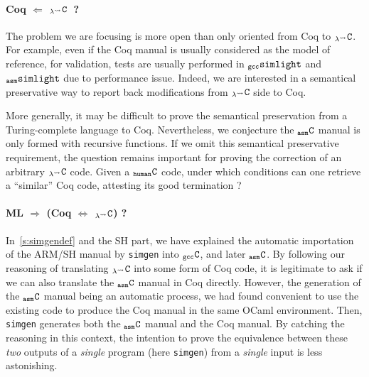 \documentclass[a4paper, 11pt]{article}
\newcommand{\gccSL}{$_{\tt gcc}{\tt simlight}$\xspace}
\newcommand{\aSL}{$_{\tt asm}{\tt simlight}$\xspace} %
\newcommand{\simgen}{{\tt simgen}\xspace}
\newcommand{\gccC}{$_{\tt gcc}{\tt C}$\xspace}
\newcommand{\hC}{$_{\tt human}{\tt C}$\xspace}
\newcommand{\aC}{$_{\tt asm}{\tt C}$\xspace}
\newcommand{\lC}{$_{\lambda^\leadsto}{\tt C}$\xspace}
\begin{document}
\paragraph{Coq $\Longleftarrow$ \lC~?}
The problem we are focusing is more open than only oriented from Coq to \lC. For example, even if the Coq manual is usually considered as the model of reference, for validation, tests are usually performed in \gccSL and \aSL due to performance issue. Indeed, we are interested in a semantical preservative way to report back modifications from \lC side to Coq. 

More generally, it may be difficult to prove the semantical preservation from a Turing-complete language to Coq. Nevertheless, we conjecture the \aC manual is only formed with recursive functions. If we omit this semantical preservative requirement, the question remains important for proving the correction of an arbitrary \lC code. Given a \hC code, under which conditions can one retrieve a ``similar'' Coq code, attesting its good termination ? 

\paragraph{ML $\Longrightarrow$ (Coq $\Longleftrightarrow$ \lC) ?}

In~\ref{s:simgendef} and the SH part, we have explained the automatic importation of the ARM/SH manual by \simgen into \gccC, and later \aC. By following our reasoning of translating \lC into some form of Coq code, it is legitimate to ask if we can also translate the \aC manual in Coq directly. However, the generation of the \aC manual being an automatic process, we had found convenient to use the existing code to produce the Coq manual in the same OCaml environment. Then, \simgen generates both the \aC manual and the Coq manual. By catching the reasoning in this context, the intention to prove the equivalence between these \emph{two} outputs of a \emph{single} program (here \simgen) from a \emph{single} input is less astonishing. 
\end{document}
